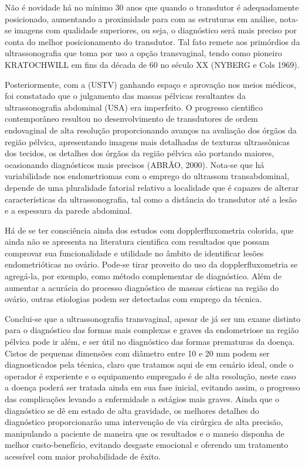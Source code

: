 \documentclass[12pt]{article} %
\begin{document}
Não é novidade há no mínimo 30 anos que quando o transdutor é adequadamente posicionado, aumentando a proximidade para com as estruturas em análise, nota-se imagens com qualidade superiores, ou seja, o diagnóstico será mais preciso por conta do melhor posicionamento do transdutor. Tal fato remete aos primórdios da ultrassonografia que toma por uso a opção transvaginal, tendo como pioneiro KRATOCHWILL em fins da década de 60 no século XX (NYBERG e Cols 1969). 

Posteriormente, com a (USTV) ganhando espaço e aprovação nos meios médicos, foi constatado que o julgamento das massas pélvicas resultantes da ultrassonografia abdominal (USA) era imperfeito. O progresso cientifico contemporâneo resultou no desenvolvimento de transdutores de ordem endovaginal de alta resolução proporcionando avanços na avaliação dos órgãos da região pélvica, apresentando imagens mais detalhadas de texturas ultrassônicas dos tecidos, os detalhes dos órgãos da região pélvica são portando maiores, ocasionando diagnósticos mais precisos (ABRÃO, 2000). Nota-se que há variabilidade nos endometriomas com o emprego do ultrassom transabdominal, depende de uma pluralidade fatorial relativo a localidade que é capazes de alterar características da ultrassonografia, tal como a distância do transdutor até a lesão e a espessura da parede abdominal. 

Há de se ter consciência ainda dos estudos com dopplerfluxometria colorida, que ainda não se apresenta na literatura cientifica com resultados que possam comprovar sua
funcionalidade e utilidade no âmbito de identificar lesões endometrióticas no ovário. Pode-se tirar proveito do uso da dopplerfluxometria se agregá-la, por exemplo, como método complementar de diagnóstico. Além de aumentar a acurácia do processo diagnóstico de massas císticas na região do ovário, outras etiologias podem ser detectadas com emprego da técnica. 


Conclui-se que a ultrassonografia transvaginal, apesar de já ser um exame distinto para o diagnóstico das formas mais complexas e graves da endometriose na região pélvica pode ir além, e ser útil no diagnóstico das formas prematuras da doença. Cistos de pequenas dimensões com diâmetro entre 10 e 20 mm podem ser diagnosticados pela técnica, claro que tratamos aqui de em cenário ideal, onde o operador é experiente e o equipamento empregado é de alta resolução, neste caso a doença poderá ser tratada ainda em sua fase inicial, evitando assim, o progresso das complicações levando a enfermidade a estágios mais graves.  Ainda que o diagnóstico se dê em estado de alta gravidade, os melhores detalhes do diagnóstico proporcionarão uma intervenção de via cirúrgica de alta precisão, manipulando a paciente de maneira que os resultados e o maneio disponha de melhor custo-benefício, evitando desgaste emocional e oferendo um tratamento acessível com maior probabilidade de êxito.     
\end{document}
